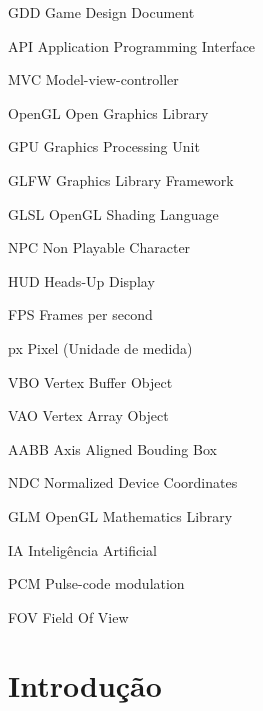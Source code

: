 \documentclass[12pt, 
openright, 
oneside, 
a4paper,    
brazil]{facom-ufu-abntex2}
\begin{document}
\begin{siglas} 
  \item[GDD] Game Design Document 
  \item[API] Application Programming Interface
  \item[MVC] Model-view-controller
  \item[OpenGL] Open Graphics Library
  \item[GPU] Graphics Processing Unit
  \item[GLFW] Graphics Library Framework
  \item[GLSL] OpenGL Shading Language
  \item[NPC] Non Playable Character
  \item[HUD] Heads-Up Display
  \item[FPS] Frames per second
  \item[px] Pixel (Unidade de medida)
  \item[VBO] Vertex Buffer Object
  \item[VAO] Vertex Array Object
  \item[AABB] Axis Aligned Bouding Box
  \item[NDC] Normalized Device Coordinates
  \item[GLM] OpenGL Mathematics Library
  \item[IA] Inteligência Artificial
  \item[PCM] Pulse-code modulation 
  \item[FOV] Field Of View
\end{siglas}


\tableofcontents*
\cleardoublepage






\chapter{Introdução}
\end{document}
